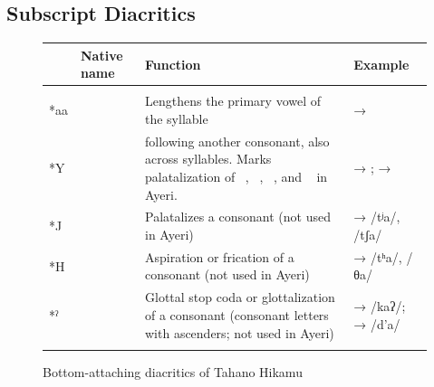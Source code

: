 \subsection{Subscript Diacritics}

\begin{figure}
\caption{Bottom-attaching diacritics of Tahano Hikamu}
\begin{tabu} to 
\toprule
\tableheaderfont

	& Native name
	& Function
	& Example
	\\
	
\toprule

\tablesubheaderfont{}\\

\midrule

*aa
	& 
	& Lengthens the primary vowel of the syllable
	&  → 
	\\

\midrule
	
*Y
	& 
	&  following another consonant, also across syllables. Marks 
		palatalization of ~, ~, 
		~, and ~ in Ayeri.
	&  → ;  → 
	\\
	
\midrule
	
*J
	& 
	& Palatalizes a consonant (not used in Ayeri)
	&  →  /tʲa/, /tʃa/
	\\
	
\midrule
	
*H
	& 
	& Aspiration or frication of a consonant (not used in Ayeri)
	&  →  /tʰa/, {/θa/}
	\\
	
\midrule
	
*\hspace{-.25em}ˀ
	& 
	& Glottal stop coda or glottalization of a consonant (consonant letters 
		with ascenders; not used in Ayeri)
	&  →  /kaʔ/;  →  /d’a/
	\\

\midrule

\tablesubheaderfont{}\\


\end{tabu}
\end{figure}
